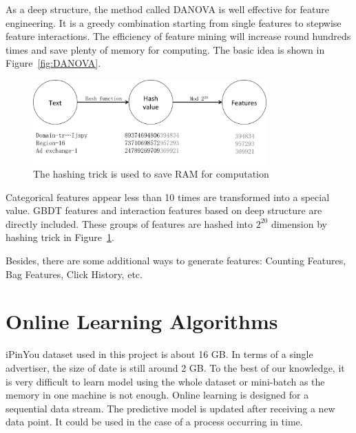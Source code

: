 As a deep structure, the method called DANOVA \cite{yoshuabengioolivierdelalleau2012,olivierdelalleauyoshuabengio2012} is well effective for feature engineering. It is a greedy combination starting from single features to stepwise feature interactions. The efficiency of feature mining will increase round hundreds times and save plenty of memory for computing. The basic idea is shown in Figure~\ref{fig:DANOVA}.


\begin{figure}[htbp]
\centering
\includegraphics[width=0.8\textwidth]{hashing.png}
\caption{The hashing trick is used to save RAM for computation}
\label{fig:hashing}
\end{figure}

Categorical features appear less than 10 times are transformed into a special value. GBDT features and interaction features based on deep structure are directly included. These groups of features are hashed into $2^{20}$ dimension by hashing trick in Figure~\ref{fig:hashing}. 

Besides, there are some additional ways to generate features: Counting Features, Bag Features, Click History, etc.

\section{Online Learning Algorithms}

iPinYou dataset used in this project is about 16 GB. In terms of a single advertiser, the size of date is still around 2 GB. To the best of our knowledge, it is very difficult to learn model using the whole dataset or mini-batch as the memory in one machine is not enough. Online learning is designed for a sequential data stream. The predictive model is updated after receiving a new data point. It could be used in the case of a process occurring in time. 

